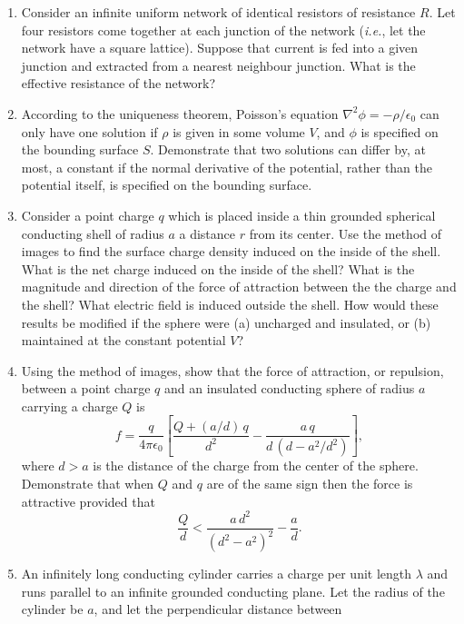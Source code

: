 {\begin{enumerate}
radius $a$, and outer radius $b$. Let the plate be fabricated from
metal of uniform resistivity $\eta$. Suppose that an electrical current $I$ is
fed into the plate symmetrically at its inner radius, and extracted symmetrically at its outer radius. What is the resistance of the plate?
What is the rate of ohmic heating of the plate?
\item Consider an infinite uniform network of identical resistors of resistance $R$.
Let four resistors come together at each junction of the network ({\em i.e.}, let the network have a square lattice).
Suppose that current is fed into a given junction and extracted from a
nearest neighbour junction. What is the effective resistance of the network?
\item According to the uniqueness theorem, Poisson's equation $\nabla^2\phi=-\rho/\epsilon_0$ can only have one solution if $\rho$ is given
in some volume $V$, and $\phi$ is specified on the bounding surface $S$.
Demonstrate that two solutions can differ by, at most, a constant if
the normal derivative of the potential, rather than the potential itself,
is specified on the bounding surface.
\item Consider  a point charge $q$ which  is placed inside a thin grounded spherical conducting shell 
of radius $a$ a distance $r$ from its center. Use the method of images
to find the surface charge density induced on the inside of the shell. What is
the net charge induced on the inside of the shell? What is the magnitude and direction of
the force of attraction between the the charge and the shell? What electric field is induced outside the shell. How would
these results be modified if the sphere were (a) uncharged and insulated, or
(b) maintained at the constant potential $V$?
\item Using the method of images, show that the force of attraction, or repulsion, between a
point charge $q$ and an insulated conducting sphere of radius $a$ carrying a charge $Q$ is
$$
f = \frac{q}{4\pi\epsilon_0}\left[\frac{Q + (a/d)\,q}{d^2} - \frac{a\,q}{d\,(d-a^2/d^2)}\right],
$$
where $d>a$ is the distance of the charge from the center of the sphere.
Demonstrate that when $Q$ and $q$ are of the same sign then the force
is attractive provided that
$$
\frac{Q}{d} < \frac{a\,d^2}{(d^2-a^2)^2}-\frac{a}{d}.
$$
\item An infinitely long conducting cylinder carries a charge per unit length
$\lambda$ and runs parallel to an infinite grounded conducting plane. Let the
radius of the cylinder be $a$, and let the perpendicular distance between

\end{enumerate}}
